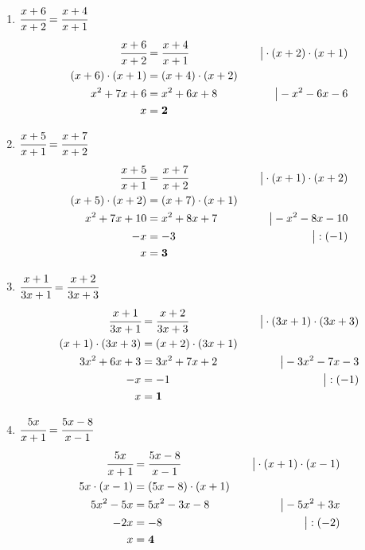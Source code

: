 \documentclass[a4paper,10pt]{article} %
\begin{document}
\begin{enumerate}[label=\alph*)]

  \item \(\cfrac{x + 6}{x + 2} = \cfrac{x + 4}{x + 1}\)
  \[
    \begin{aligned}
      \cfrac{x + 6}{x + 2} &= \cfrac{x + 4}{x + 1} &\quad\big| \cdot (x + 2) \cdot (x + 1) \\
      (x + 6) \cdot (x + 1) &= (x + 4) \cdot (x + 2) \\
      x^2 + 7x + 6 &= x^2 + 6x + 8 &\quad\big| - x^2 - 6x - 6 \\
      x &= \mathbf{2}
    \end{aligned}
  \]

  \item \(\cfrac{x + 5}{x + 1} = \cfrac{x + 7}{x + 2}\)
  \[
    \begin{aligned}
      \cfrac{x + 5}{x + 1} &= \cfrac{x + 7}{x + 2} &\quad\big| \cdot (x + 1) \cdot (x + 2) \\
      (x + 5) \cdot (x + 2) &= (x + 7) \cdot (x + 1) \\
      x^2 + 7x + 10 &= x^2 + 8x + 7 &\quad\big| - x^2 - 8x - 10 \\
      -x &= -3 &\quad\big| : (-1) \\
      x &= \mathbf{3}
    \end{aligned}
  \]

  \item \(\cfrac{x + 1}{3x + 1} = \cfrac{x + 2}{3x + 3}\)
  \[
    \begin{aligned}
      \cfrac{x + 1}{3x + 1} &= \cfrac{x + 2}{3x + 3} &\quad\big| \cdot (3x + 1) \cdot (3x + 3) \\
      (x + 1) \cdot (3x + 3) &= (x + 2) \cdot (3x + 1) \\
      3x^2 + 6x + 3 &= 3x^2 + 7x + 2 &\quad\big| - 3x^2 - 7x - 3 \\
      -x &= -1 &\quad\big| : (-1) \\
      x &= \mathbf{1}
    \end{aligned}
  \]

  \item \(\cfrac{5x}{x + 1} = \cfrac{5x - 8}{x - 1}\)
  \[
    \begin{aligned}
      \cfrac{5x}{x + 1} &= \cfrac{5x - 8}{x - 1} &\quad\big| \cdot (x + 1) \cdot (x - 1) \\
      5x \cdot (x - 1) &= (5x - 8) \cdot (x + 1) \\
      5x^2 - 5x &= 5x^2 - 3x - 8 &\quad\big| - 5x^2 + 3x \\
      -2x &= -8 &\quad\big| : (-2) \\
      x &= \mathbf{4}
    \end{aligned}
  \]

\end{enumerate}
\end{document}
